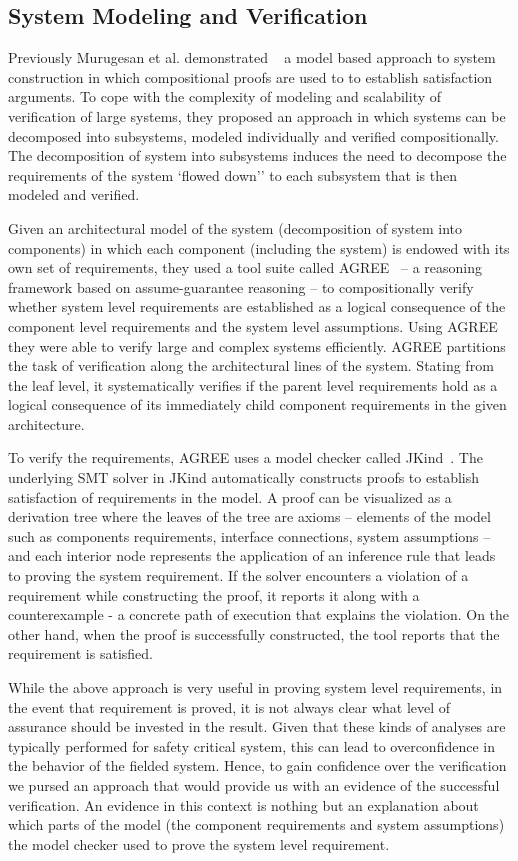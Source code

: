 \subsection{System Modeling and Verification}

Previously Murugesan et al. demonstrated ~\cite{hilt2013} a model based approach to system construction in which compositional proofs are used to to establish satisfaction arguments. To cope with the complexity of modeling and scalability of verification of large systems,
they proposed an approach in which systems can be decomposed into subsystems, modeled individually and verified compositionally. The decomposition of system into subsystems induces the need to decompose the requirements of the system `flowed down'' to each subsystem that is then modeled and verified.

Given an architectural model of the system (decomposition of system into components) in which each component (including the system) is endowed with its own set of requirements,
 they used a tool suite called AGREE~\cite{NFM2012:CoGaMiWhLaLu} -- a reasoning framework based on assume-guarantee reasoning -- to compositionally verify whether system level requirements are established as a logical consequence of the component level requirements and the system level assumptions.
 Using AGREE they were able to verify large and complex systems efficiently. AGREE partitions the task of verification along the architectural lines of the system. Stating from the leaf level, it systematically verifies if the parent level requirements hold as a logical consequence of its immediately child component requirements in the given architecture.

To verify the requirements, AGREE uses a model checker called JKind~\cite{jkind}. The underlying SMT solver in JKind automatically constructs proofs to establish satisfaction of requirements in the model. A proof can be visualized as a derivation tree where the leaves of the tree are axioms -- elements of the model such as components requirements, interface connections, system assumptions -- and each interior node represents the application of an inference rule that leads to proving the system requirement. If the solver encounters a violation of a requirement while constructing the proof, it reports it along with a counterexample - a concrete path of execution that explains the violation. On the other hand, when the proof is successfully constructed, the tool reports that the requirement is satisfied.

While the above approach is very useful in proving system level requirements, in the event
that requirement is proved, it is not always clear what level of assurance should be invested in the
result.  Given that these kinds of analyses are typically performed for safety critical system, this
can lead to overconfidence in the behavior of the fielded system.
Hence, to gain confidence over the verification we pursed an approach that would provide
us with an evidence of the successful verification. An evidence in this context is nothing but an
explanation about which parts of the model (the component requirements and system assumptions) the
model checker used to prove the system level requirement.

